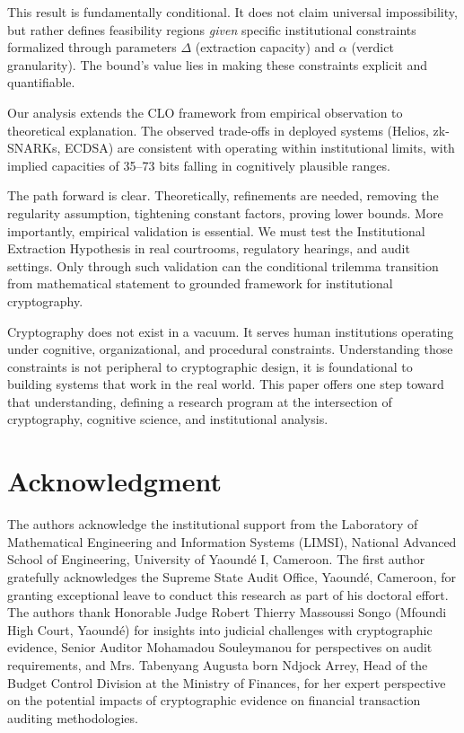 \documentclass{ieeeaccess}
\begin{document}
This result is fundamentally conditional. It does not claim universal impossibility, but rather defines feasibility regions \emph{given} specific institutional constraints formalized through parameters $\Delta$ (extraction capacity) and $\alpha$ (verdict granularity). The bound's value lies in making these constraints explicit and quantifiable.

Our analysis extends the CLO framework from empirical observation to theoretical explanation. The observed trade-offs in deployed systems (Helios, zk-SNARKs, ECDSA) are consistent with operating within institutional limits, with implied capacities of 35--73 bits falling in cognitively plausible ranges.

The path forward is clear. Theoretically, refinements are needed, removing the regularity assumption, tightening constant factors, proving lower bounds. More importantly, empirical validation is essential. We must test the Institutional Extraction Hypothesis in real courtrooms, regulatory hearings, and audit settings. Only through such validation can the conditional trilemma transition from mathematical statement to grounded framework for institutional cryptography.

Cryptography does not exist in a vacuum. It serves human institutions operating under cognitive, organizational, and procedural constraints. Understanding those constraints is not peripheral to cryptographic design, it is foundational to building systems that work in the real world. This paper offers one step toward that understanding, defining a research program at the intersection of cryptography, cognitive science, and institutional analysis.

\section*{Acknowledgment}

The authors acknowledge the institutional support from the Laboratory of Mathematical Engineering and Information Systems (LIMSI), National Advanced School of Engineering, University of Yaoundé I, Cameroon. 
The first author gratefully acknowledges the Supreme State Audit Office, Yaoundé, Cameroon, for granting exceptional leave to conduct this research as part of his doctoral effort.
The authors thank Honorable Judge Robert Thierry Massoussi Songo (Mfoundi High Court, Yaoundé) for insights into judicial challenges with cryptographic evidence, Senior Auditor Mohamadou Souleymanou for perspectives on audit requirements, and Mrs. Tabenyang Augusta born Ndjock Arrey, Head of the Budget Control Division at the Ministry of Finances, for her expert perspective on the potential impacts of cryptographic evidence on financial transaction auditing methodologies.
\end{document}

